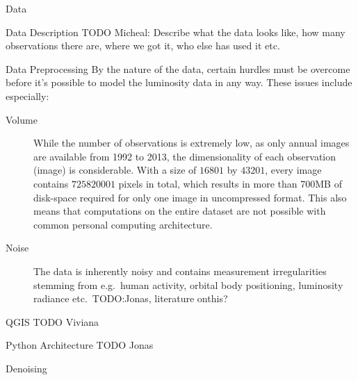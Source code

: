 \documentclass[12pt,fleqn,leqno,letterpaper]{article}
\begin{document}
\begin{section}{Data}
  \begin{subsection}{Data Description}
    TODO Micheal: Describe what the data looks like, how many observations there are, where we got it, who else has used it etc.
  \end{subsection}
  \begin{subsection}{Data Preprocessing}
    By the nature of the data, certain hurdles must be overcome before it's possible to model the luminosity data in any way. These issues include especially:
    \begin{description}
      \item[Volume]{While the number of observations is extremely low, as only annual images are available from 1992 to 2013, the dimensionality of each observation (image) is considerable. With a size of $16801$ by $43201$, every image contains $725820001$ pixels in total, which results in more than 700MB of disk-space required for only one image in uncompressed format. This also means that computations on the entire dataset are not possible with common personal computing architecture.}
      \item[Noise]{The data is inherently noisy and contains measurement irregularities stemming from e.g.\ human activity, orbital body positioning, luminosity radiance etc.\ TODO:Jonas, literature onthis?}
    \end{description}
    \begin{subsubsection}{QGIS}
      TODO Viviana
    \end{subsubsection}
    \begin{subsubsection}{Python Architecture}
      TODO Jonas
    \end{subsubsection}
    \begin{subsubsection}{Denoising}
      \begin{figure}[t!]
        \centering

\end{figure}
\end{subsubsection}
\end{subsection}
\end{section}
\end{document}
